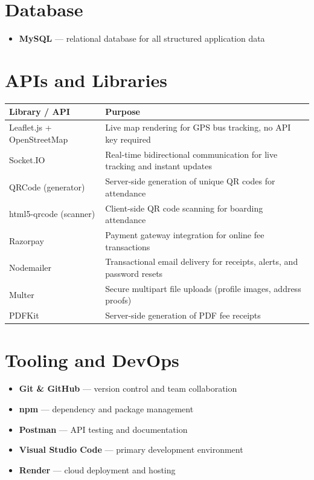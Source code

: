 \documentclass[11pt,a4paper]{report}
\begin{document}
\section{Database}
\begin{itemize}[leftmargin=1.3em]
  \item \textbf{MySQL} --- relational database for all structured application data
\end{itemize}

\section{APIs and Libraries}
\begin{longtable}{@{}p{4cm}p{9.5cm}@{}}
\toprule
\rowcolor{pine!10}\textbf{Library / API} & \textbf{Purpose} \\
\midrule
\endhead
Leaflet.js + OpenStreetMap & Live map rendering for GPS bus tracking, no API key required \\
Socket.IO & Real-time bidirectional communication for live tracking and instant updates \\
QRCode (generator) & Server-side generation of unique QR codes for attendance \\
html5-qrcode (scanner) & Client-side QR code scanning for boarding attendance \\
Razorpay & Payment gateway integration for online fee transactions \\
Nodemailer & Transactional email delivery for receipts, alerts, and password resets \\
Multer & Secure multipart file uploads (profile images, address proofs) \\
PDFKit & Server-side generation of PDF fee receipts \\
\bottomrule
\end{longtable}

\section{Tooling and DevOps}
\begin{itemize}[leftmargin=1.3em]
  \item \textbf{Git \& GitHub} --- version control and team collaboration
  \item \textbf{npm} --- dependency and package management
  \item \textbf{Postman} --- API testing and documentation
  \item \textbf{Visual Studio Code} --- primary development environment
  \item \textbf{Render} --- cloud deployment and hosting
\end{itemize}
\end{document}
